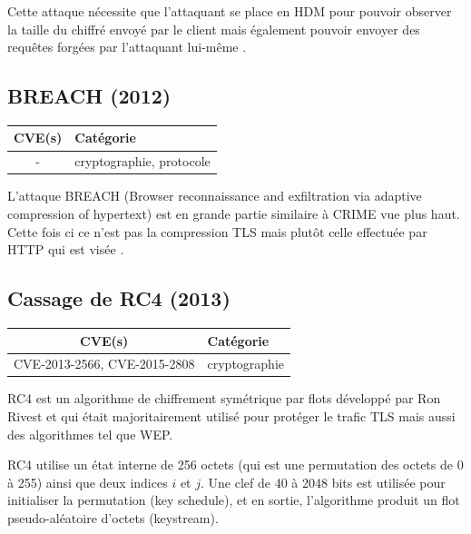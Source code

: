 Cette attaque nécessite que l'attaquant se place en HDM pour pouvoir observer la taille du chiffré envoyé par le client mais également pouvoir envoyer des requêtes forgées par l'attaquant lui-même \cite{crime}.




\subsection{BREACH (2012)}

\begin{tabularx}{0.96\textwidth}{|c|X|}
  \hline
  \textbf{CVE(s)} & \textbf{Catégorie} \\
  \hline
  - & cryptographie, protocole \\
  \hline
\end{tabularx}

\vspace{1em}


L'attaque BREACH (Browser reconnaissance and exfiltration via adaptive compression of hypertext) est en grande partie similaire à CRIME vue plus haut. Cette fois ci ce n'est pas la compression TLS mais plutôt celle effectuée par HTTP qui est visée \cite{breach}.




\subsection{Cassage de RC4 (2013)}

\begin{tabularx}{0.96\textwidth}{|c|X|}
  \hline
  \textbf{CVE(s)} & \textbf{Catégorie} \\
  \hline
  CVE-2013-2566, CVE-2015-2808 & cryptographie \\
  \hline
\end{tabularx}

\vspace{1em}


RC4 est un algorithme de chiffrement symétrique par flots développé par Ron Rivest et qui était majoritairement utilisé pour protéger le trafic TLS mais aussi des algorithmes tel que WEP.

RC4 utilise un état interne de 256 octets (qui est une permutation des octets de 0 à 255) ainsi que deux indices $i$ et $j$. Une clef de 40 à 2048 bits est utilisée pour initialiser la permutation (key schedule), et en sortie, l'algorithme produit un flot pseudo-aléatoire d'octets (keystream).

